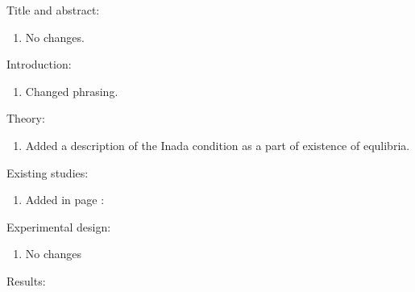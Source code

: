 \vspace{2ex}
Title and abstract:
\begin{enumerate}
\vspace{1.0ex}\setlength{\itemsep}{1.0ex}\setlength{\baselineskip}{12pt}
\item	No changes.
\end{enumerate}
Introduction:
\begin{enumerate}
\vspace{1.0ex}\setlength{\itemsep}{1.0ex}\setlength{\baselineskip}{12pt}
\item	Changed phrasing.
\end{enumerate}
Theory:
\begin{enumerate}
\vspace{1.0ex}\setlength{\itemsep}{1.0ex}\setlength{\baselineskip}{12pt}
\item	Added a description of the Inada condition as a part of existence of equlibria.
\end{enumerate}
Existing studies:
\begin{enumerate}
\vspace{1.0ex}\setlength{\itemsep}{1.0ex}\setlength{\baselineskip}{12pt}
\item	Added in page \pageref{PageOfCostsMFReduced}:
\end{enumerate}
Experimental design:
\begin{enumerate}
\vspace{1.0ex}\setlength{\itemsep}{1.0ex}\setlength{\baselineskip}{12pt}
\item	No changes
\end{enumerate}
Results: 
